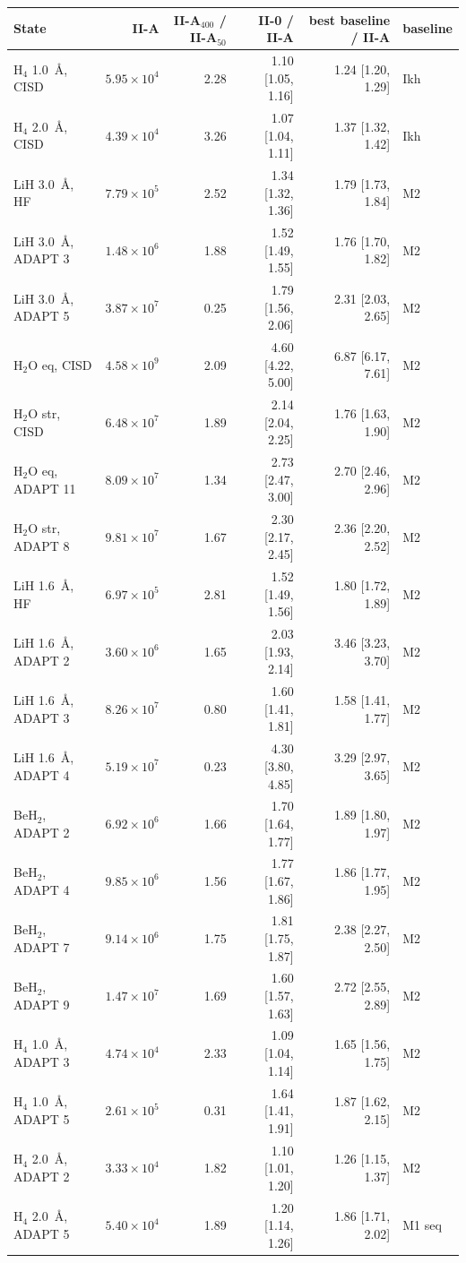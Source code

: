\begin{tabular}{@{}lrrrrl@{}}
\toprule
State & II-A & II-A$_{400}$ / II-A$_{50}$ & II-0 / II-A & best baseline / II-A & baseline \\
\midrule
H$_4$ 1.0~\AA, CISD & $5.95\times10^{4}$ & 2.28 & 1.10 [1.05, 1.16] & 1.24 [1.20, 1.29] & Ikh \\
H$_4$ 2.0~\AA, CISD & $4.39\times10^{4}$ & 3.26 & 1.07 [1.04, 1.11] & 1.37 [1.32, 1.42] & Ikh \\
LiH 3.0~\AA, HF & $7.79\times10^{5}$ & 2.52 & 1.34 [1.32, 1.36] & 1.79 [1.73, 1.84] & M2 \\
LiH 3.0~\AA, ADAPT 3 & $1.48\times10^{6}$ & 1.88 & 1.52 [1.49, 1.55] & 1.76 [1.70, 1.82] & M2 \\
LiH 3.0~\AA, ADAPT 5 & $3.87\times10^{7}$ & 0.25 & 1.79 [1.56, 2.06] & 2.31 [2.03, 2.65] & M2 \\
H$_2$O eq, CISD & $4.58\times10^{9}$ & 2.09 & 4.60 [4.22, 5.00] & 6.87 [6.17, 7.61] & M2 \\
H$_2$O str, CISD & $6.48\times10^{7}$ & 1.89 & 2.14 [2.04, 2.25] & 1.76 [1.63, 1.90] & M2 \\
H$_2$O eq, ADAPT 11 & $8.09\times10^{7}$ & 1.34 & 2.73 [2.47, 3.00] & 2.70 [2.46, 2.96] & M2 \\
H$_2$O str, ADAPT 8 & $9.81\times10^{7}$ & 1.67 & 2.30 [2.17, 2.45] & 2.36 [2.20, 2.52] & M2 \\
LiH 1.6~\AA, HF & $6.97\times10^{5}$ & 2.81 & 1.52 [1.49, 1.56] & 1.80 [1.72, 1.89] & M2 \\
LiH 1.6~\AA, ADAPT 2 & $3.60\times10^{6}$ & 1.65 & 2.03 [1.93, 2.14] & 3.46 [3.23, 3.70] & M2 \\
LiH 1.6~\AA, ADAPT 3 & $8.26\times10^{7}$ & 0.80 & 1.60 [1.41, 1.81] & 1.58 [1.41, 1.77] & M2 \\
LiH 1.6~\AA, ADAPT 4 & $5.19\times10^{7}$ & 0.23 & 4.30 [3.80, 4.85] & 3.29 [2.97, 3.65] & M2 \\
BeH$_2$, ADAPT 2 & $6.92\times10^{6}$ & 1.66 & 1.70 [1.64, 1.77] & 1.89 [1.80, 1.97] & M2 \\
BeH$_2$, ADAPT 4 & $9.85\times10^{6}$ & 1.56 & 1.77 [1.67, 1.86] & 1.86 [1.77, 1.95] & M2 \\
BeH$_2$, ADAPT 7 & $9.14\times10^{6}$ & 1.75 & 1.81 [1.75, 1.87] & 2.38 [2.27, 2.50] & M2 \\
BeH$_2$, ADAPT 9 & $1.47\times10^{7}$ & 1.69 & 1.60 [1.57, 1.63] & 2.72 [2.55, 2.89] & M2 \\
\midrule
H$_4$ 1.0~\AA, ADAPT 3 & $4.74\times10^{4}$ & 2.33 & 1.09 [1.04, 1.14] & 1.65 [1.56, 1.75] & M2 \\
H$_4$ 1.0~\AA, ADAPT 5 & $2.61\times10^{5}$ & 0.31 & 1.64 [1.41, 1.91] & 1.87 [1.62, 2.15] & M2 \\
H$_4$ 2.0~\AA, ADAPT 2 & $3.33\times10^{4}$ & 1.82 & 1.10 [1.01, 1.20] & 1.26 [1.15, 1.37] & M2 \\
H$_4$ 2.0~\AA, ADAPT 5 & $5.40\times10^{4}$ & 1.89 & 1.20 [1.14, 1.26] & 1.86 [1.71, 2.02] & M1 seq \\
\bottomrule
\end{tabular}
